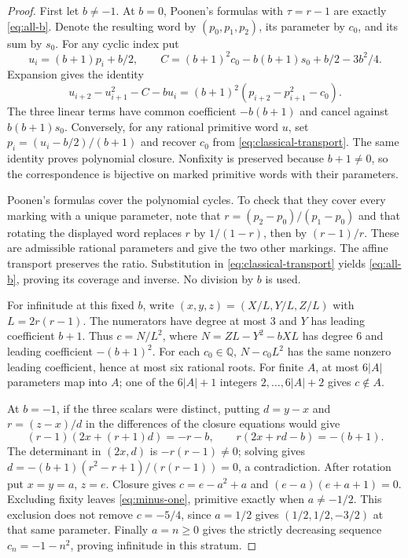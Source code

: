 \documentclass{jT}
\newcommand{\Q}{\mathbb Q}
\begin{document}
\begin{proof}
First let $b\ne-1$. At $b=0$, Poonen's formulas with $\tau=r-1$ are exactly \eqref{eq:all-b}. Denote the resulting word by $(p_0,p_1,p_2)$, its parameter by $c_0$, and its sum by $s_0$. For any cyclic index put
\begin{equation}\label{eq:classical-transport}
u_i=(b+1)p_i+b/2,\qquad
C=(b+1)^2c_0-b(b+1)s_0+b/2-3b^2/4.
\end{equation}
Expansion gives the identity
\[
u_{i+2}-u_{i+1}^2-C-bu_i
=(b+1)^2(p_{i+2}-p_{i+1}^2-c_0).
\]
The three linear terms have common coefficient $-b(b+1)$ and cancel against $b(b+1)s_0$. Conversely, for any rational primitive word $u$, set $p_i=(u_i-b/2)/(b+1)$ and recover $c_0$ from \eqref{eq:classical-transport}. The same identity proves polynomial closure. Nonfixity is preserved because $b+1\ne0$, so the correspondence is bijective on marked primitive words with their parameters.

Poonen's formulas cover the polynomial cycles. To check that they cover every marking with a unique parameter, note that $r=(p_2-p_0)/(p_1-p_0)$ and that rotating the displayed word replaces $r$ by $1/(1-r)$, then by $(r-1)/r$. These are admissible rational parameters and give the two other markings. The affine transport preserves the ratio. Substitution in \eqref{eq:classical-transport} yields \eqref{eq:all-b}, proving its coverage and inverse. No division by $b$ is used.

For infinitude at this fixed $b$, write $(x,y,z)=(X/L,Y/L,Z/L)$ with $L=2r(r-1)$. The numerators have degree at most 3 and $Y$ has leading coefficient $b+1$. Thus $c=N/L^2$, where $N=ZL-Y^2-bXL$ has degree 6 and leading coefficient $-(b+1)^2$. For each $c_0\in\Q$, $N-c_0L^2$ has the same nonzero leading coefficient, hence at most six rational roots. For finite $A$, at most $6|A|$ parameters map into $A$; one of the $6|A|+1$ integers $2,\ldots,6|A|+2$ gives $c\notin A$.

At $b=-1$, if the three scalars were distinct, putting $d=y-x$ and $r=(z-x)/d$ in the differences of the closure equations would give
\[
(r-1)(2x+(r+1)d)=-r-b,\qquad
r(2x+rd-b)=-(b+1).
\]
The determinant in $(2x,d)$ is $-r(r-1)\ne0$; solving gives $d=-(b+1)(r^2-r+1)/(r(r-1))=0$, a contradiction. After rotation put $x=y=a$, $z=e$. Closure gives $c=e-a^2+a$ and $(e-a)(e+a+1)=0$. Excluding fixity leaves \eqref{eq:minus-one}, primitive exactly when $a\ne-1/2$. This exclusion does not remove $c=-5/4$, since $a=1/2$ gives $(1/2,1/2,-3/2)$ at that same parameter. Finally $a=n\ge0$ gives the strictly decreasing sequence $c_n=-1-n^2$, proving infinitude in this stratum.
\end{proof}
\end{document}
